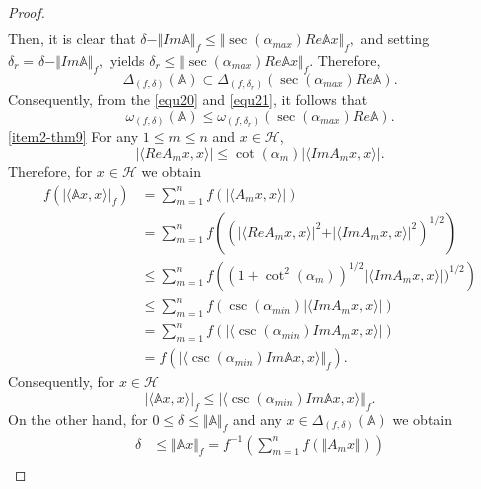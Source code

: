 \documentclass[12pt]{article}
\begin{document}
\begin{proof}
\begin{align*}
\end{align*}
Then, it is clear that
\(
\delta - \Vert Im \mathbb{A} \Vert_{f} \leq  \Vert \sec(\alpha_{max})Re\mathbb{A}x \Vert_{f},
\)
and setting $\delta_{r}=\delta - \Vert Im \mathbb{A} \Vert_{f},   $
yields
\(
\delta_{r} \leq  \Vert \sec(\alpha_{max})Re\mathbb{A}x \Vert_{f}.
\)
Therefore,
\begin{equation}
\label{equ21}
\Delta_{(f,\delta)}(\mathbb{A})\subset\Delta_{(f,\delta_{r})}\left( \sec(\alpha_{max})Re\mathbb{A} \right) .
\end{equation}
Consequently, from the \eqref{equ20} and \eqref{equ21}, it follows that
\[
\omega_{(f,\delta)}(\mathbb{A})\leq \omega_{(f,\delta_{r})}(\sec(\alpha_{max})Re\mathbb{A}).
\]
\noindent \ref{item2-thm9} For any $ 1\leq m\leq n $ and $ x\in \mathcal{H} $,
\[
\vert \langle Re A_{m}x,x\rangle \vert \leq \cot(\alpha_{m}) \vert \langle Im A_{m}x,x\rangle \vert .
\]
Therefore, for $ x\in \mathcal{H} $ we obtain
\begin{align*}
f\left(  \vert \langle \mathbb{A}x,x \rangle \vert_{f}\right) &= \sum\limits_{m=1}^{n} f\left(  \vert \langle A_{m}x,x \rangle \vert\right) \\
&= \sum\limits_{m=1}^{n} f\left( \left( \vert \langle ReA_{m}x,x\rangle \vert^{2} + \vert \langle ImA_{m}x,x\rangle \vert^{2}\right) ^{1/2} \right) \\
&\leq \sum\limits_{m=1}^{n} f \left( \left( 1+\cot^{2}(\alpha_{m}) \right)^{1/2} \vert \langle ImA_{m}x,x\rangle \vert )^{1/2}\right) \\
&\leq \sum\limits_{m=1}^{n} f \left( \csc(\alpha_{min})\vert \langle ImA_{m}x,x\rangle \vert \right) \\
&= \sum\limits_{m=1}^{n} f \left( \vert \langle \csc(\alpha_{min})ImA_{m}x,x\rangle \vert \right) \\
&= f \left( \vert \langle \csc(\alpha_{min})Im\mathbb{A}x,x\rangle \Vert_{f}\right) .
\end{align*}
Consequently, for $ x\in \mathcal{H} $
\begin{equation}
\label{equ22}
\vert \langle \mathbb{A} x,x \rangle \vert_{f}\leq \vert \langle \csc(\alpha_{min})Im\mathbb{A}x,x\rangle \Vert_{f} .
\end{equation}
On the other hand, for $ 0\leq\delta\leq \Vert  \mathbb{A} \Vert_{f} $ and any $ x\in \Delta_{(f,\delta)}( \mathbb{A}) $ we obtain
\begin{align*}
\delta &\leq \Vert \mathbb{A} x \Vert_{f} = f^{-1}\left( \sum\limits_{m=1}^{n}f\left( \Vert A_{m}x \Vert \right)  \right) \\

\end{align*}
\end{proof}
\end{document}
